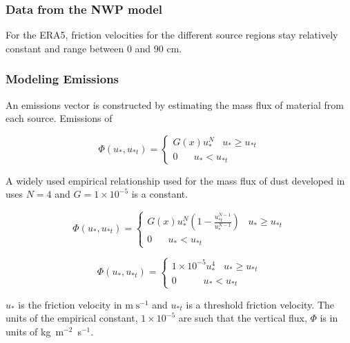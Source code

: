 \documentclass[draft]{agujournal2018}
\begin{document}
\subsubsection{Data from the NWP model}
For the ERA5, friction velocities for the different source regions stay relatively constant and range
between 0 and 90 cm.

\subsubsection{Modeling Emissions}

An emissions vector  is constructed by estimating the mass flux of material from each source.
Emissions of 

\begin{equation}
\Phi(u_*, u_{*t}) =\begin{cases}
G(x)u_*^N \;\;\; u_{*} \geq u_{*t} \\
0 \;\;\;\;\;\;  u_* < u_{*t} 
\end{cases}
\label{eq:massflux}
\end{equation}

A widely used empirical relationship used for the mass flux of dust developed in ~\citep{westphal}  
uses $N=4$ and $G=1\times10^{-5}$ is a constant. 

\begin{equation}
\Phi(u_*, u_{*t}) =\begin{cases}
G(x)u_*^N (1-\frac{u_{*t}^{N-1}}{u_{*}^{N-1}})  \;\;\; u_{*} \geq u_{*t} \\
0 \;\;\;\;\;\;  u_* < u_{*t} 
\end{cases}
\label{eq:shao}
\end{equation}


\begin{equation}
\Phi(u_*, u_{*t}) =\begin{cases}
1\times10^{-5}u_*^4 \;\;\; u_{*} \geq u_{*t} \\
0 \;\;\;\;\;\;\;\;\;\;  u_* < u_{*t} 
\end{cases}
\label{eq:westphal}
\end{equation}

$u_*$ is the friction velocity in $\mathrm{m}\;\mathrm{s}^{-1}$ and $u_{*t}$ is a threshold friction velocity.
The units of the empirical constant, $1\times10^{-5}$ are such that the vertical flux, $\Phi$ is in units of kg~m$^{-2}$~s$^{-1}$.

\end{document}
